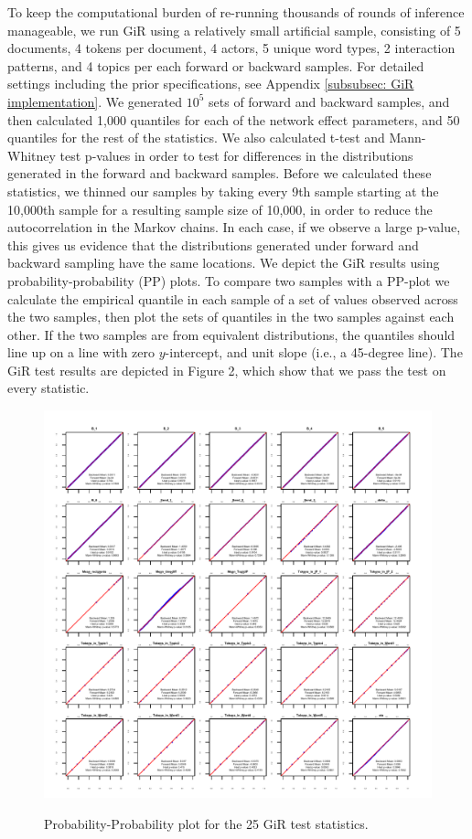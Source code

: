 \documentclass[a4paper]{article}
\begin{document}
To keep the computational burden of re-running thousands of rounds of inference manageable, we run GiR using a relatively small artificial sample, consisting of 5 documents, 4 tokens per document, 4 actors, 5 unique word types, 2 interaction patterns, and 4 topics per each forward or backward samples. For detailed settings including the prior specifications, see Appendix \ref{subsubsec: GiR implementation}. 
We generated $10^5$ sets of forward and backward samples, and then calculated 1,000 quantiles for each of the network effect parameters, and 50 quantiles for the rest of the statistics. We also calculated t-test and Mann-Whitney test p-values in order to test for differences in the distributions generated in the forward and backward samples. Before we calculated these statistics, we thinned our samples 
by taking every 9th sample starting at the 10,000th sample for a resulting sample size of 10,000, in order to reduce the autocorrelation in the Markov chains. In each case, if we observe a large p-value, this gives us evidence that the distributions generated under forward and backward sampling have the same locations. We depict the GiR results using probability-probability (PP) plots. To compare two samples with a PP-plot we calculate the empirical quantile in each sample of a set of values observed across the two samples, then plot the sets of quantiles in the two samples against each other. If the two samples are from equivalent distributions, the quantiles should line up on a line with zero $y$-intercept, and unit slope (i.e., a 45-degree line). The GiR test results are depicted in Figure 2, which show that we pass the test on every statistic.
\begin{figure}[H]
	\centering
	\includegraphics[width=1\textwidth]{plots/GiReta.pdf} 
	\label{fig:PPplot}
	\caption{Probability-Probability plot for the 25 GiR test statistics.}
\end{figure}
\end{document}
